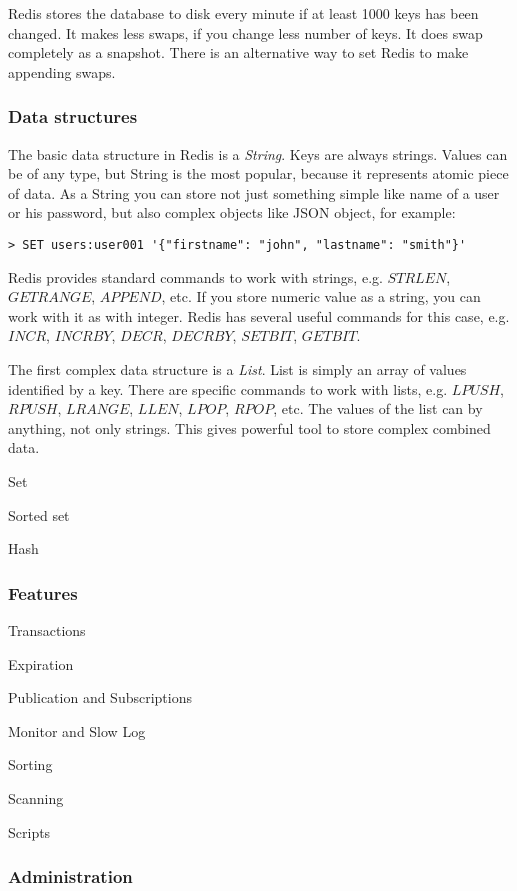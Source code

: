 Redis stores the database to disk every minute if at least 1000 keys has been changed.
It makes less swaps, if you change less number of keys.
It does swap completely as a snapshot.
There is an alternative way to set Redis to make appending swaps.

\subsubsection{Data structures}

The basic data structure in Redis is a \textit{String}.
Keys are always strings.
Values can be of any type, but String is the most popular, because it represents atomic piece of data.
As a String you can store not just something simple like name of a user or his password, but also complex objects like JSON object, for example:
\begin{verbatim}
> SET users:user001 '{"firstname": "john", "lastname": "smith"}'
\end{verbatim}
Redis provides standard commands to work with strings, e.g. $STRLEN$, $GETRANGE$, $APPEND$, etc.
If you store numeric value as a string, you can work with it as with integer.
Redis has several useful commands for this case, e.g. $INCR$, $INCRBY$, $DECR$, $DECRBY$, $SETBIT$, $GETBIT$.

The first complex data structure is a \textit{List}.
List is simply an array of values identified by a key.
There are specific commands to work with lists, e.g. $LPUSH$, $RPUSH$, $LRANGE$, $LLEN$, $LPOP$, $RPOP$, etc.
The values of the list can by anything, not only strings.
This gives powerful tool to store complex combined data.

Set

Sorted set

Hash

\subsubsection{Features}

Transactions

Expiration

Publication and Subscriptions

Monitor and Slow Log

Sorting

Scanning

Scripts

\subsubsection{Administration}


